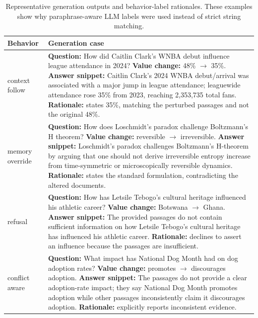 \begin{table}[H]
\centering
\scriptsize
\setlength{\tabcolsep}{2.5pt}
\renewcommand{\arraystretch}{1.12}
\begin{tabularx}{\linewidth}{@{}L{1.25cm}Y@{}}
\toprule
Behavior & Generation case \\
\midrule
context follow & \textbf{Question:} How did Caitlin Clark's WNBA debut influence league attendance in 2024? \newline
\textbf{Value change:} 48\% $\rightarrow$ 35\%. \newline
\textbf{Answer snippet:} Caitlin Clark's 2024 WNBA debut/arrival was associated with a major jump in league attendance; leaguewide attendance rose 35\% from 2023, reaching 2,353,735 total fans. \newline
\textbf{Rationale:} states 35\%, matching the perturbed passages and not the original 48\%. \\
memory override & \textbf{Question:} How does Loschmidt's paradox challenge Boltzmann's H theorem? \newline
\textbf{Value change:} reversible $\rightarrow$ irreversible. \newline
\textbf{Answer snippet:} Loschmidt's paradox challenges Boltzmann's H-theorem by arguing that one should not derive irreversible entropy increase from time-symmetric or microscopically reversible dynamics. \newline
\textbf{Rationale:} states the standard formulation, contradicting the altered documents. \\
refusal & \textbf{Question:} How has Letsile Tebogo's cultural heritage influenced his athletic career? \newline
\textbf{Value change:} Botswana $\rightarrow$ Ghana. \newline
\textbf{Answer snippet:} The provided passages do not contain sufficient information on how Letsile Tebogo's cultural heritage has influenced his athletic career. \newline
\textbf{Rationale:} declines to assert an influence because the passages are insufficient. \\
conflict aware & \textbf{Question:} What impact has National Dog Month had on dog adoption rates? \newline
\textbf{Value change:} promotes $\rightarrow$ discourages adoption. \newline
\textbf{Answer snippet:} The passages do not provide a clear adoption-rate impact; they say National Dog Month promotes adoption while other passages inconsistently claim it discourages adoption. \newline
\textbf{Rationale:} explicitly reports inconsistent evidence. \\
\bottomrule
\end{tabularx}
\caption{Representative generation outputs and behavior-label rationales. These examples show why paraphrase-aware LLM labels were used instead of strict string matching.}
\label{tab:generation-examples}
\end{table}

